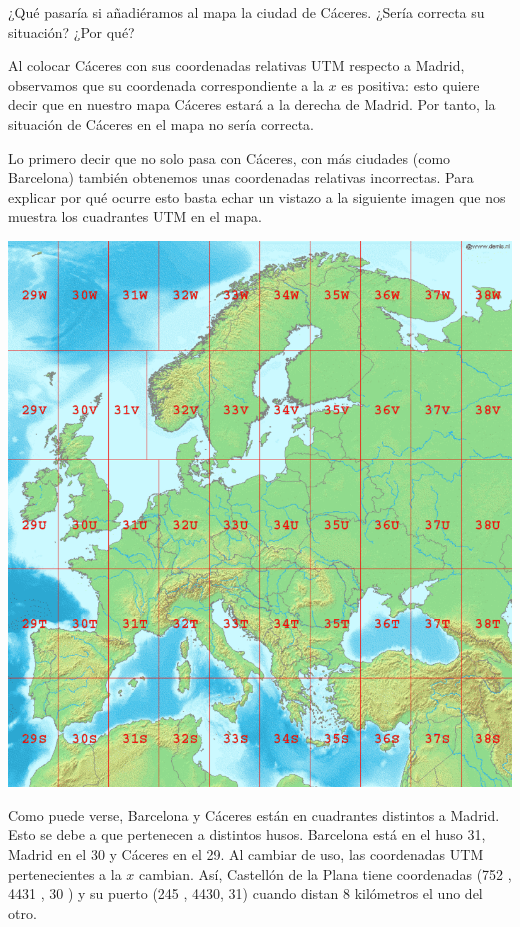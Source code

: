 \documentclass[11pt, a4paper, spanish, openright, twoside]{book}
\begin{document}
	\begin{section}{ ¿Qué pasaría si añadiéramos al mapa la ciudad de Cáceres. ¿Sería correcta su situación? ¿Por qué?}
	
		Al colocar Cáceres con sus coordenadas relativas UTM respecto a Madrid, observamos que su coordenada correspondiente 
		a la $x$ es positiva: esto quiere decir que en nuestro mapa Cáceres estará a la derecha de Madrid. Por tanto, la situación de Cáceres 
		en el mapa no sería correcta.

		Lo primero decir que no solo pasa con Cáceres,  con más ciudades (como Barcelona) también obtenemos unas coordenadas relativas 
		incorrectas. Para explicar por qué ocurre esto basta echar un vistazo a la siguiente imagen que nos muestra los cuadrantes UTM en
		el mapa.

	\begin{center}
	\includegraphics[scale=0.45]{mapaUTM}
	\end{center}
	
		Como puede verse, Barcelona y Cáceres están en cuadrantes distintos a Madrid.
		Esto se debe a que pertenecen a distintos husos. Barcelona está en el huso 31, Madrid en el 30 y Cáceres en el 29. Al cambiar de uso, 
		las coordenadas UTM pertenecientes a la $x$ cambian. Así, Castellón de la Plana tiene coordenadas (752 ,  4431 ,  30 ) y su puerto (245  ,  4430, 31) 
		cuando distan 8 kilómetros el uno del otro.

	\end{section}
\end{document}
